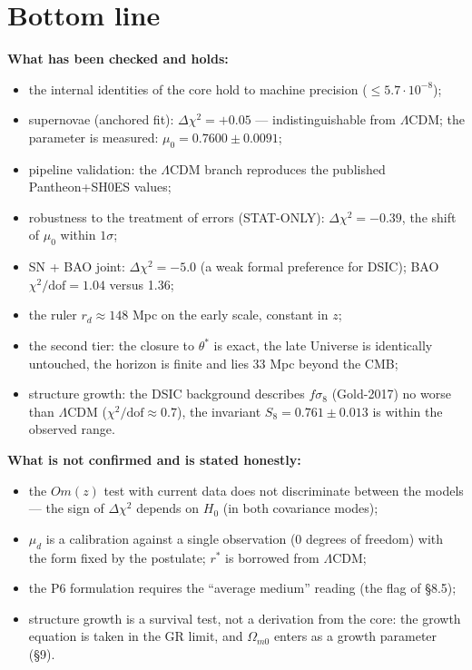 \documentclass[a4paper,10pt]{article}
\begin{document}
\section{Bottom line}

\noindent\textbf{What has been checked and holds:}
\begin{itemize}
  \item the internal identities of the core hold to machine precision ($\le 5.7{\cdot}10^{-8}$);
  \item supernovae (anchored fit): $\Delta\chi^2 = +0.05$ --- indistinguishable from $\Lambda$CDM; the parameter is measured: $\mu_0 = 0.7600 \pm 0.0091$;
  \item pipeline validation: the $\Lambda$CDM branch reproduces the published Pantheon+SH0ES values;
  \item robustness to the treatment of errors (STAT-ONLY): $\Delta\chi^2 = -0.39$, the shift of $\mu_0$ within $1\sigma$;
  \item SN + BAO joint: $\Delta\chi^2 = -5.0$ (a weak formal preference for DSIC); BAO $\chi^2/\text{dof} = 1.04$ versus 1.36;
  \item the ruler $r_d \approx 148$ Mpc on the early scale, constant in $z$;
  \item the second tier: the closure to $\theta^*$ is exact, the late Universe is identically untouched, the horizon is finite and lies $33$ Mpc beyond the CMB;
  \item structure growth: the DSIC background describes $f\sigma_8$ (Gold-2017) no worse than $\Lambda$CDM ($\chi^2/\text{dof} \approx 0.7$), the invariant $S_8 = 0.761 \pm 0.013$ is within the observed range.
\end{itemize}

\noindent\textbf{What is not confirmed and is stated honestly:}
\begin{itemize}
  \item the $Om(z)$ test with current data does not discriminate between the models --- the sign of $\Delta\chi^2$ depends on $H_0$ (in both covariance modes);
  \item $\mu_d$ is a calibration against a single observation (0 degrees of freedom) with the form fixed by the postulate; $r^*$ is borrowed from $\Lambda$CDM;
  \item the P6 formulation requires the ``average medium'' reading (the flag of \S8.5);
  \item structure growth is a survival test, not a derivation from the core: the growth equation is taken in the GR limit, and $\Omega_{m0}$ enters as a growth parameter (\S9).
\end{itemize}
\end{document}

